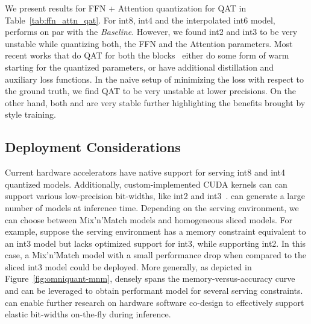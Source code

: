 We present results for FFN + Attention quantization for QAT in Table~\ref{tab:ffn_attn_qat}. For int8, int4 and the interpolated int6 model, \alg performs on par with the \textit{Baseline}. However, we found int2 and int3 to be very unstable while quantizing both, the FFN and the Attention parameters. Most recent works that do QAT for both the blocks~\cite{DBLP:efficientqat, DBLP:llmqat, DBLP:BitDistiller} either do some form of warm starting for the quantized parameters, or have additional distillation and auxiliary loss functions. In the naive setup of minimizing the loss with respect to the ground truth, we find QAT to be very unstable at lower precisions. On the other hand, both \alg and \spalg are very stable further highlighting the benefits brought by \alg style training. 

\vspace*{-3mm}
\subsection{Deployment Considerations}
\label{sec:dep}
\vspace*{-1mm}
Current hardware accelerators have native support for serving int8 and int4 quantized models. Additionally, custom-implemented CUDA kernels can can support various low-precision bit-widths, like int2 and int3~\citep{chee2024quip,frantar2022gptq}. \alg can generate a large number of models at inference time. Depending on the serving environment, we can choose between Mix'n'Match models and homogeneous sliced models. For example, suppose the serving environment has a memory constraint equivalent to an int3 model but lacks optimized support for int3, while supporting int2. In this case, a Mix'n'Match model with a small performance drop when compared to the sliced int3 model could be deployed. More generally, as depicted in Figure~\ref{fig:omniquant-mnm}, \alg densely spans the memory-versus-accuracy curve and can be leveraged to obtain performant model for several serving constraints. \alg can enable further research on hardware software co-design to effectively support elastic bit-widths on-the-fly during inference.



